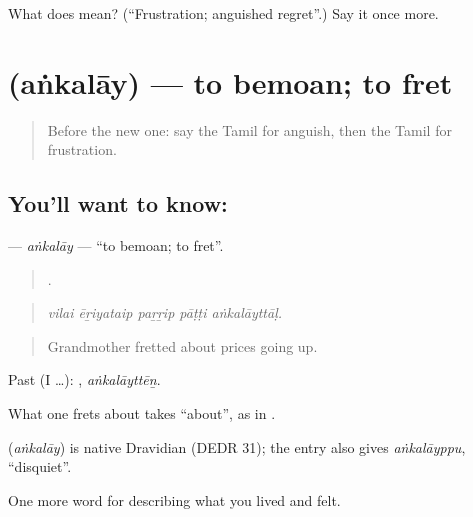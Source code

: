 \begin{tcolorbox}[breakable,colback=teal!4,colframe=teal!35!black,title={Before you move on}]
What does  mean? (\textquotedblleft{}Frustration; anguished regret\textquotedblright{}.) Say it once more.
\end{tcolorbox}
\section[\texorpdfstring{\ta{அங்கலாய்} (aṅkalāy)}{அங்கலாய் (aṅkalāy)}]{ (aṅkalāy) — to bemoan; to fret}

\label{lesson:TA-C455-ankalay}



\begin{quote}
Before the new one: say the Tamil for anguish, then the Tamil for frustration.
\end{quote}

\subsection*{You'll want to know: }
\textbf{} — \emph{aṅkalāy} — \textquotedblleft{}to bemoan; to fret\textquotedblright{}.

\begin{quote}
    .
\end{quote}

\begin{quote}
\emph{vilai ēṟiyataip paṟṟip pāṭṭi aṅkalāyttāḷ.}
\end{quote}

\begin{quote}
Grandmother fretted about prices going up.
\end{quote}

Past (I …): , \emph{aṅkalāyttēṉ}.

What one frets about takes  \textquotedblleft{}about\textquotedblright{}, as in   .

\begin{cousinweb}
\textbf{} (\emph{aṅkalāy}) is native Dravidian (DEDR 31); the entry also gives  \emph{aṅkalāyppu}, \textquotedblleft{}disquiet\textquotedblright{}.
\end{cousinweb}

\begin{grammarlens}[title={What you've built}]
One more word for describing what you lived and felt.
\end{grammarlens}

